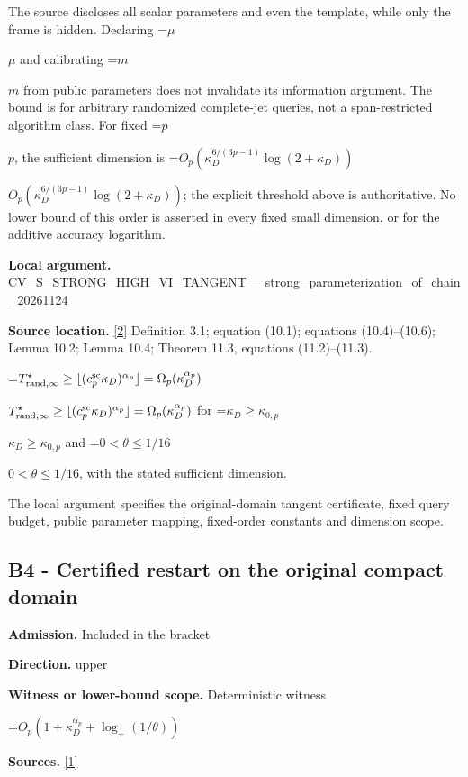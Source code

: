 \documentclass[10pt,a4paper]{article}
\newcommand{\AtlasMath}[1]{\par\begingroup\centering\setbox0=\hbox{$\displaystyle #1$}\ifdim\wd0>1.4\linewidth\typeout{ATLAS WIDE FORMULA: \the\wd0}\fi\ifdim\wd0>\linewidth\resizebox{\linewidth}{!}{\box0}\else\box0\fi\par\endgroup}
\newcommand{\AtlasInlineMath}[1]{\begingroup\setbox0=\hbox{$#1$}\ifdim\wd0>.4\linewidth\endgroup\AtlasMath{#1}\else\endgroup$#1$\fi}
\begin{document}
The source discloses all scalar parameters and even the template, while only the frame is hidden. Declaring \AtlasInlineMath{\mu} and calibrating \AtlasInlineMath{m} from public parameters does not invalidate its information argument. The bound is for arbitrary randomized complete-jet queries, not a span-restricted algorithm class. For fixed \AtlasInlineMath{p}, the sufficient dimension is \AtlasInlineMath{O_p(\kappa_D^{6/(3p-1)}\log(2+\kappa_D))}; the explicit threshold above is authoritative. No lower bound of this order is asserted in every fixed small dimension, or for the additive accuracy logarithm.



\textbf{Local argument.} CV\_S\_STRONG\_HIGH\_VI\_TANG\allowbreak{}ENT\_\_strong\_parameteriza\allowbreak{}tion\_of\_chain\_20261124



\textbf{Source location.} \href{https://arxiv.org/pdf/2609.13462v2}{[2]} Definition 3.1; equation (10.1); equations (10.4)--(10.6); Lemma 10.2; Lemma 10.4; Theorem 11.3, equations (11.2)--(11.3).



\AtlasInlineMath{T^\star_{{\rm rand},\infty}\ge\lfloor(c_p^{\rm sc}\kappa_D)^{\alpha_p}\rfloor=\Omega_p(\kappa_D^{\alpha_p})} for \AtlasInlineMath{\kappa_D\ge\kappa_{0,p}} and \AtlasInlineMath{0<\theta\le1/16}, with the stated sufficient dimension.



The local argument specifies the original-domain tangent certificate, fixed query budget, public parameter mapping, fixed-order constants and dimension scope.



\subsection{B4 - Certified restart on the original compact domain}


\textbf{Admission.} Included in the bracket



\textbf{Direction.} upper



\textbf{Witness or lower-bound scope.} Deterministic witness



\AtlasMath{O_p\!\left(1+\kappa_D^{\alpha_p}+\log_+(1/\theta)\right)}


\textbf{Sources.} \href{https://arxiv.org/pdf/2609.23557v1}{[1]}
\end{document}
